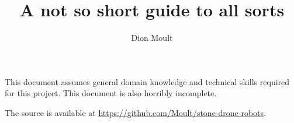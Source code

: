 \documentclass{article}
\author{Dion Moult}
\title{A not so short guide to all sorts}
\begin{document}
\maketitle
This document assumes general domain knowledge and technical skills required for this project. This document is also horribly incomplete.

The source is available at \url{https://github.com/Moult/stone-drone-robots}.




\end{document}
